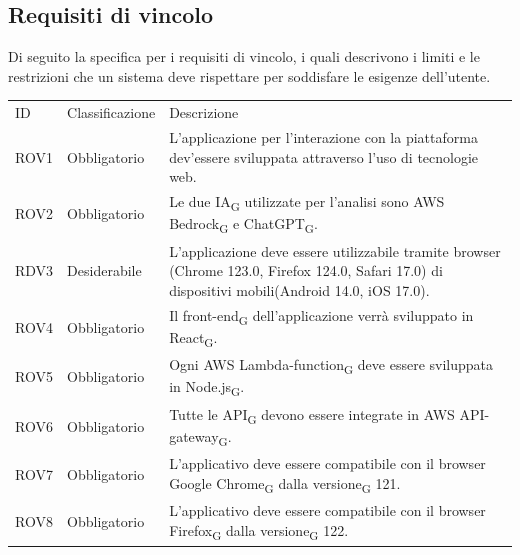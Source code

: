 \documentclass{article}
\begin{document}
\subsection{Requisiti di vincolo}
Di seguito la specifica per i requisiti di vincolo, i quali descrivono i limiti e le restrizioni che un sistema
deve rispettare per soddisfare le esigenze dell'utente.
\begin{center}

    \begin{tabular}{|p{3cm}|p{3cm}|p{6cm}|}
    \rowcolor{Blue} 
\hline
ID & Classificazione & Descrizione \\ 
\rowcolor{LightBlue}
\hline
ROV1& Obbligatorio & L'applicazione per l'interazione con la piattaforma dev'essere sviluppata attraverso l'uso di tecnologie web.\\ 
\hline
\rowcolor{LighterBlue}
ROV2& Obbligatorio & Le due IA\textsubscript{G} utilizzate per l'analisi sono AWS Bedrock\textsubscript{G} e ChatGPT\textsubscript{G}. \\ 
\rowcolor{LightBlue}
\hline
RDV3& Desiderabile & L'applicazione deve essere utilizzabile tramite browser (Chrome 123.0, Firefox 124.0, Safari 17.0) di dispositivi mobili(Android 14.0, iOS 17.0).\\
\hline
\rowcolor{LighterBlue}

ROV4& Obbligatorio & Il front-end\textsubscript{G} dell'applicazione verrà sviluppato in React\textsubscript{G}.\\
\rowcolor{LightBlue}
\hline
ROV5& Obbligatorio & Ogni AWS Lambda-function\textsubscript{G} deve essere sviluppata in Node.js\textsubscript{G}.\\
\hline
\rowcolor{LighterBlue}

ROV6& Obbligatorio & Tutte le API\textsubscript{G} devono essere integrate in AWS API-gateway\textsubscript{G}.\\
\hline
\rowcolor{LightBlue}
ROV7& Obbligatorio & L'applicativo deve essere compatibile con il browser Google Chrome\textsubscript{G} dalla versione\textsubscript{G} 121.\\
\hline
\rowcolor{LighterBlue}
ROV8& Obbligatorio & L'applicativo deve essere compatibile con il browser Firefox\textsubscript{G} dalla versione\textsubscript{G} 122.\\
\hline
\end{tabular}
\end{center}
\end{document}
